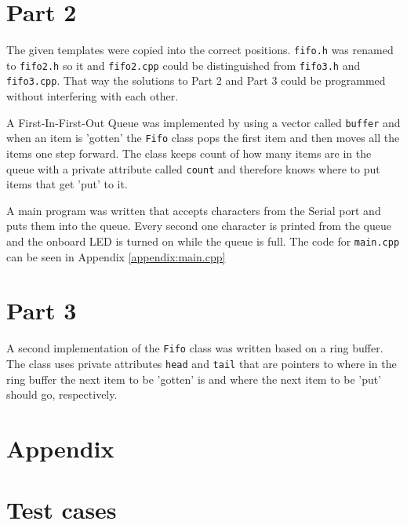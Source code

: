 \documentclass{article}
\begin{document}
\section*{Part 2}
The given templates were copied into the correct positions. \verb!fifo.h! was renamed to \verb!fifo2.h! so it and \verb!fifo2.cpp! could be distinguished from \verb"fifo3.h" and \verb"fifo3.cpp". That way the solutions to Part 2 and Part 3 could be programmed without interfering with each other.

A First-In-First-Out Queue was implemented by using a vector called \verb"buffer" and when an item is 'gotten' the \verb"Fifo" class pops the first item and then moves all the items one step forward. The class keeps count of how many items are in the queue with a private attribute called \verb"count" and therefore knows where to put items that get 'put' to it.




A main program was written that accepts characters from the Serial port and puts them into the queue. Every second one character is printed from the queue and the onboard LED is turned on while the queue is full. The code for \verb!main.cpp! can be seen in Appendix \ref{appendix:main.cpp}

\section*{Part 3}
A second implementation of the \verb!Fifo! class was written based on a ring buffer. The class uses private attributes \verb"head" and \verb"tail" that are pointers to where in the ring buffer the next item to be 'gotten' is and where the next item to be 'put' should go, respectively.



\newpage
\section*{Appendix}
\appendix
\section{Test cases}\label{appendix:test_main.cpp}

\end{document}
